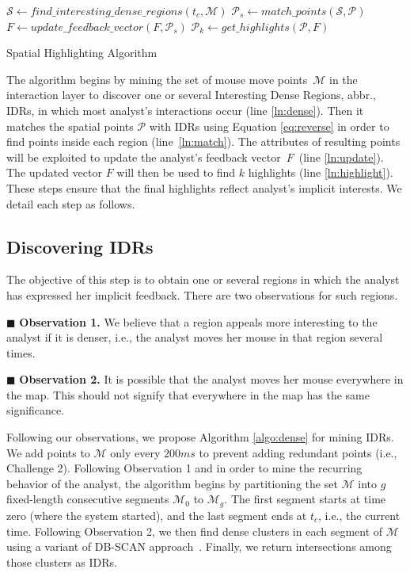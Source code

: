 \documentclass[sigconf,edbt]{acmart-edbt2019}
\begin{document}
\begin{algorithm}[t]
\DontPrintSemicolon
{}
$\mathcal{S} \gets \mathit{find\_interesting\_dense\_regions}(t_c,\mathcal{M})$\label{ln:dense}\;
$\mathcal{P}_s \gets \mathit{match\_points}(\mathcal{S}, \mathcal{P})$\label{ln:match}\;
$F \gets \mathit{update\_feedback\_vector}(F, \mathcal{P}_s)$\label{ln:update}\;
$\mathcal{P}_k \gets \mathit{get\_highlights}(\mathcal{P}, F)$\label{ln:highlight}\;
\; 
\caption{Spatial Highlighting Algorithm}
\label{algo:main}
\end{algorithm}

\vspace{2pt}
The algorithm begins by mining the set of mouse move points~$\mathcal{M}$ in the interaction layer to discover one or several Interesting Dense Regions, abbr., IDRs, in which most analyst's interactions occur (line \ref{ln:dense}). Then it matches the spatial points $\mathcal{P}$ with IDRs using Equation \ref{eq:reverse} in order to find points inside each region (line~\ref{ln:match}). The attributes of resulting points will be exploited to update the analyst's feedback vector~$F$~(line \ref{ln:update}). The updated vector $F$ will then be used to find $k$ highlights (line \ref{ln:highlight}). These steps ensure that the final highlights reflect analyst's implicit interests. We detail each step as follows.

\subsection{Discovering IDRs}
The objective of this step is to obtain one or several regions in which the analyst has expressed her implicit feedback. There are two observations for such regions.

\vspace{2pt}
\noindent $\blacksquare$ {\bf Observation 1.} We believe that a region appeals more interesting to the analyst if it is denser, i.e., the analyst moves her mouse in that region several times.

\vspace{2pt}
\noindent $\blacksquare$ {\bf Observation 2.} It is possible that the analyst moves her mouse everywhere in the map. This should not signify that everywhere in the map has the same significance.

\vspace{2pt}
Following our observations, we propose Algorithm \ref{algo:dense} for mining IDRs. We add points to $\mathcal{M}$ only every $200ms$ to prevent adding redundant points (i.e., Challenge 2).  Following Observation 1 and in order to mine the recurring behavior of the analyst, the algorithm begins by partitioning the set $\mathcal{M}$ into $g$ fixed-length consecutive segments $\mathcal{M}_0$ to $\mathcal{M}_g$. The first segment starts at time zero (where the system started), and the last segment ends at $t_c$, i.e., the current time. Following Observation 2, we then find dense clusters in each segment of $\mathcal{M}$ using a variant of DB-SCAN approach~\cite{Ester:1996}. Finally, we return intersections among those clusters as IDRs.
\end{document}
